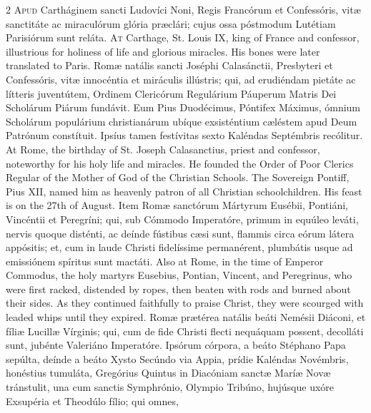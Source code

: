 \begin{paracol}{2}
\lettrine[lines=2]{A}{pud} Cartháginem sancti 
 Ludovíci Noni, Regis Francórum et Confessóris, vitæ sanctitáte ac 
 miraculórum glória præclári; cujus ossa póstmodum Lutétiam Parisiórum sunt 
 reláta.
\switchcolumn
{}
\lettrine[lines=2]{A}{t} Carthage, St. Louis IX, king of 
 France and confessor, illustrious for holiness of life and glorious 
 miracles. His bones were later translated to Paris.
\switchcolumn*
{}
Romæ natális sancti 
 Joséphi Calasánctii, Presbyteri et Confessóris, vitæ innocéntia et miráculis 
 illústris; qui, ad erudiéndam pietáte ac lítteris juventútem, Ordinem 
 Clericórum Regulárium Páuperum Matris Dei Scholárum Piárum fundávit. 
 Eum Pius Duodécimus, Póntifex Máximus, ómnium Scholárum populárium 
 christianárum ubíque exsisténtium cæléstem apud Deum Patrónum constítuit. 
 Ipsíus tamen festívitas sexto Kaléndas Septémbris recólitur.
\switchcolumn
{}
At Rome, the birthday of St. Joseph 
 Calasanctius, priest and confessor, noteworthy for his holy life and 
 miracles. He founded the Order of Poor Clerics Regular of the Mother 
 of God of the Christian Schools. The Sovereign Pontiff, Pius XII, 
 named him as heavenly patron of all Christian schoolchildren. His 
 feast is on the 27th of August.
\switchcolumn*
{}
Item Romæ sanctórum 
 Mártyrum Eusébii, Pontiáni, Vincéntii et Peregríni; qui, sub Cómmodo 
 Imperatóre, primum in equúleo leváti, nervis quoque disténti, ac deínde 
 fústibus cæsi sunt, flammis circa eórum látera appósitis; et, cum in laude 
 Christi fidelíssime permanérent, plumbátis usque ad emissiónem spíritus sunt 
 mactáti.
\switchcolumn
{}
Also at Rome, in the time of Emperor 
 Commodus, the holy martyrs Eusebius, Pontian, Vincent, and Peregrinus, who 
 were first racked, distended by ropes, then beaten with rods and burned 
 about their sides. As they continued faithfully to praise Christ, they 
 were scourged with leaded whips until they expired.
\switchcolumn*
{}
Romæ prætérea natális 
 beáti Nemésii Diáconi, et fíliæ Lucillæ Vírginis; qui, cum de fide Christi 
 flecti nequáquam possent, decolláti sunt, jubénte Valeriáno Imperatóre. 
 Ipsórum córpora, a beáto Stéphano Papa sepúlta, deínde a beáto Xysto Secúndo 
 via Appia, prídie Kaléndas Novémbris, honéstius tumuláta, Gregórius Quintus 
 in Diacóniam sanctæ Maríæ Novæ tránstulit, una cum sanctis Symphrónio, 
 Olympio Tribúno, hujúsque uxóre Exsupéria et Theodúlo fílio; qui omnes, 

\end{paracol}
